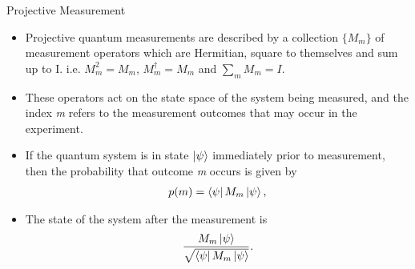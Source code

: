 \documentclass[handout, 10 pt]{beamer}
\begin{document}
    


\begin{frame}{Projective Measurement}
\begin{itemize}
    \item Projective quantum measurements are described by a collection $\{M_m\}$ of measurement operators which are Hermitian, square to themselves and sum up to I. i.e. $M_m^2=M_m$, $M_m^\dagger=M_m$ and $\sum\limits_m M_m =I$.
    \pause
    \item These operators act on the state space of the system being measured, and the index {\emph{m}} refers to the measurement outcomes that may occur in the experiment. 
    \pause
    \item If the quantum system is in state $\ket{\psi}$ immediately prior to measurement, then the probability that outcome {\emph{m}} occurs is given by 
    \begin{gather*}
       p(m)=\bra{\psi}M_m \ket{\psi},
    \end{gather*}
    \pause
    \item The state of the system after the measurement is
    \begin{gather*}
        \frac{M_m \ket{\psi}}{\sqrt{\bra{\psi}M_m \ket{\psi}}}.
    \end{gather*}
\end{itemize}
\end{frame}
\end{document}
